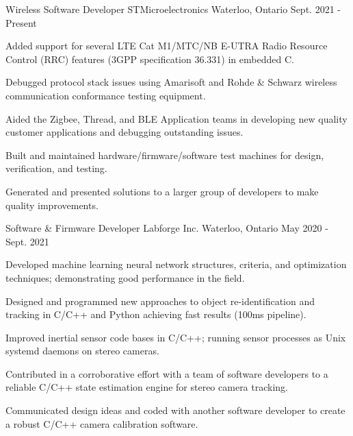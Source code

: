 
\begin{cventries}

  \cventry
    {Wireless Software Developer} %
    {STMicroelectronics} %
    {Waterloo, Ontario} %
    {Sept. 2021 - Present} %
    {
      \begin{cvitems} %
        \item {Added support for several LTE Cat M1/MTC/NB E-UTRA Radio Resource Control (RRC) features (3GPP specification 36.331) in embedded C.}
        \item {Debugged protocol stack issues using Amarisoft and Rohde \& Schwarz wireless communication conformance testing equipment.}
        \item {Aided the Zigbee, Thread, and BLE Application teams in developing new quality customer applications and debugging outstanding issues.}
        \item {Built and maintained hardware/firmware/software test machines for design, verification, and testing.}
        \item {Generated and presented solutions to a larger group of developers to make quality improvements.}
      \end{cvitems}
    }

  \cventry
    {Software \& Firmware Developer} %
    {Labforge Inc.} %
    {Waterloo, Ontario} %
    {May 2020 - Sept. 2021} %
    {
      \begin{cvitems} %
        \item {Developed machine learning neural network structures, criteria, and optimization techniques; demonstrating good performance in the field.}
        \item {Designed and programmed new approaches to object re-identification and tracking in C/C++ and Python achieving fast results (100ms pipeline).}
        \item {Improved inertial sensor code bases in C/C++; running sensor processes as Unix systemd daemons on stereo cameras.}
        \item {Contributed in a corroborative effort with a team of software developers to a reliable C/C++ state estimation engine for stereo camera tracking.}
        \item {Communicated design ideas and coded with another software developer to create a robust C/C++ camera calibration software.}
      \end{cvitems}
    }


\end{cventries}
